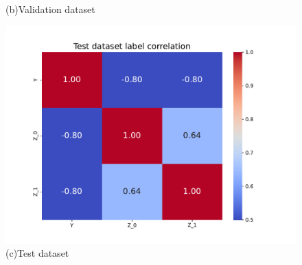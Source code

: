 \documentclass[12pt,DIV14,BCOR12mm,a4paper,footinclude=false,headinclude,parskip=half-,twoside,openright,cleardoublepage=empty,toc=index,bibliography=totoc,listof=totoc]{scrreprt}
\numberwithin{equation}{chapter}
\begin{document}
\begin{figure}[H]
\begin{minipage}[b]{0.3\textwidth}
        \caption*{(b)Validation dataset}
        \label{fig:2}
    \end{minipage}
    \hfill
    \begin{minipage}[b]{0.3\textwidth}
        \centering
        \includegraphics[width=1.5\textwidth]{thesis/figures/test_corr.pdf}
        \caption*{(c)Test dataset}
        \label{fig:3}
    \end{minipage}
    
    \vspace{0.5cm} %
    

\end{figure}
\end{document}
